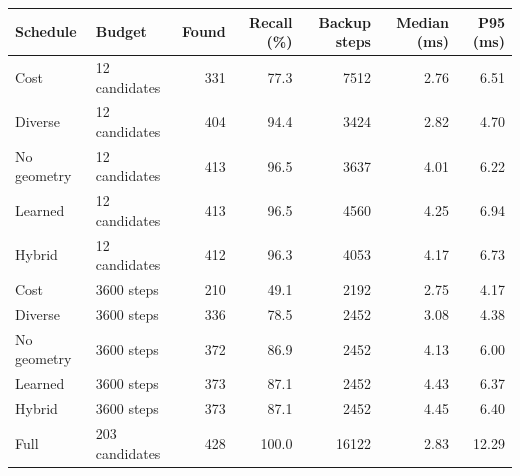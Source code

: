 \begin{tabular}{llrrrrr}
\toprule
Schedule & Budget & Found & Recall (\%) & Backup steps & Median (ms) & P95 (ms) \\
\midrule
Cost & 12 candidates & 331 & 77.3 & 7512 & 2.76 & 6.51 \\
Diverse & 12 candidates & 404 & 94.4 & 3424 & 2.82 & 4.70 \\
No geometry & 12 candidates & 413 & 96.5 & 3637 & 4.01 & 6.22 \\
Learned & 12 candidates & 413 & 96.5 & 4560 & 4.25 & 6.94 \\
Hybrid & 12 candidates & 412 & 96.3 & 4053 & 4.17 & 6.73 \\
Cost & 3600 steps & 210 & 49.1 & 2192 & 2.75 & 4.17 \\
Diverse & 3600 steps & 336 & 78.5 & 2452 & 3.08 & 4.38 \\
No geometry & 3600 steps & 372 & 86.9 & 2452 & 4.13 & 6.00 \\
Learned & 3600 steps & 373 & 87.1 & 2452 & 4.43 & 6.37 \\
Hybrid & 3600 steps & 373 & 87.1 & 2452 & 4.45 & 6.40 \\
Full & 203 candidates & 428 & 100.0 & 16122 & 2.83 & 12.29 \\
\bottomrule
\end{tabular}
